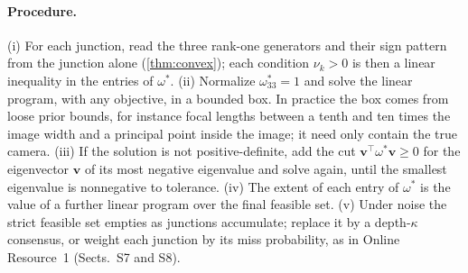 \documentclass[pdflatex,sn-mathphys-num,iicol]{sn-jnl}
\newcommand{\OR}{Online Resource~1}
\theoremstyle{thmstyleone}
\theoremstyle{thmstylethree}
\theoremstyle{thmstyletwo}
\begin{document}
\paragraph{Procedure.} (i) For each junction, read the three rank-one generators and their sign pattern from the junction alone (\cref{thm:convex}); each condition $\nu_k>0$ is then a linear inequality in the entries of $\omega^{*}$. (ii) Normalize $\omega^{*}_{33}=1$ and solve the linear program, with any objective, in a bounded box. In practice the box comes from loose prior bounds, for instance focal lengths between a tenth and ten times the image width and a principal point inside the image; it need only contain the true camera. (iii) If the solution is not positive-definite, add the cut $\mathbf v^{\top}\omega^{*}\mathbf v\ge0$ for the eigenvector $\mathbf v$ of its most negative eigenvalue and solve again, until the smallest eigenvalue is nonnegative to tolerance. (iv) The extent of each entry of $\omega^{*}$ is the value of a further linear program over the final feasible set. (v) Under noise the strict feasible set empties as junctions accumulate; replace it by a depth-$\kappa$ consensus, or weight each junction by its miss probability, as in \OR{} (Sects.~S7 and S8).
\end{document}
